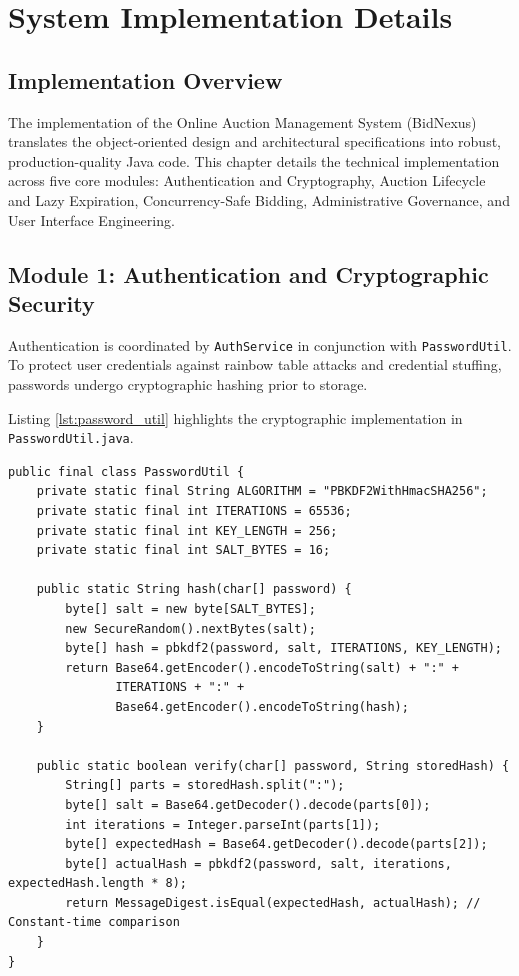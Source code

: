 \section{System Implementation Details}
\label{sec:implementation}

\subsection{Implementation Overview}
The implementation of the Online Auction Management System (BidNexus) translates the object-oriented design and architectural specifications into robust, production-quality Java code. This chapter details the technical implementation across five core modules: Authentication and Cryptography, Auction Lifecycle and Lazy Expiration, Concurrency-Safe Bidding, Administrative Governance, and User Interface Engineering.

\subsection{Module 1: Authentication and Cryptographic Security}
Authentication is coordinated by \texttt{AuthService} in conjunction with \texttt{PasswordUtil}. To protect user credentials against rainbow table attacks and credential stuffing, passwords undergo cryptographic hashing prior to storage.

Listing \ref{lst:password_util} highlights the cryptographic implementation in \texttt{PasswordUtil.java}.

\begin{lstlisting}[caption={Cryptographic Hash Generation and Verification in \texttt{PasswordUtil.java}}, label={lst:password_util}]
public final class PasswordUtil {
    private static final String ALGORITHM = "PBKDF2WithHmacSHA256";
    private static final int ITERATIONS = 65536;
    private static final int KEY_LENGTH = 256;
    private static final int SALT_BYTES = 16;

    public static String hash(char[] password) {
        byte[] salt = new byte[SALT_BYTES];
        new SecureRandom().nextBytes(salt);
        byte[] hash = pbkdf2(password, salt, ITERATIONS, KEY_LENGTH);
        return Base64.getEncoder().encodeToString(salt) + ":" + 
               ITERATIONS + ":" + 
               Base64.getEncoder().encodeToString(hash);
    }

    public static boolean verify(char[] password, String storedHash) {
        String[] parts = storedHash.split(":");
        byte[] salt = Base64.getDecoder().decode(parts[0]);
        int iterations = Integer.parseInt(parts[1]);
        byte[] expectedHash = Base64.getDecoder().decode(parts[2]);
        byte[] actualHash = pbkdf2(password, salt, iterations, expectedHash.length * 8);
        return MessageDigest.isEqual(expectedHash, actualHash); // Constant-time comparison
    }
}
\end{lstlisting}

